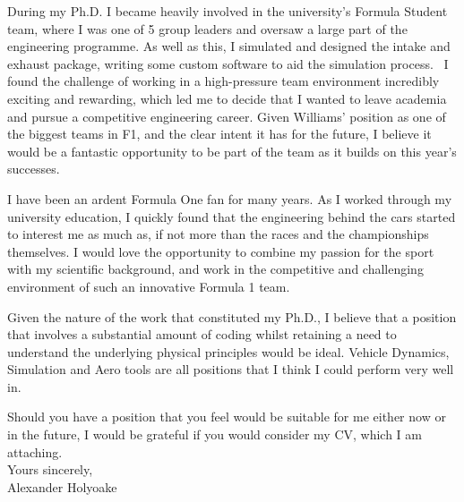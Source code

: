 \documentclass[a4paper,10pt]{article}
\begin{document}
During my Ph.D. I became heavily involved in the university's Formula Student team, where I was one of 5 group leaders and oversaw a large part of the engineering programme. As well as this, I simulated and designed the intake and exhaust package, writing some custom software to aid the simulation process.  I found the challenge of working in a high-pressure team environment incredibly exciting and rewarding, which led me to decide that I wanted to leave academia and pursue a competitive engineering career. Given Williams’ position as one of the biggest teams in F1, and the clear intent it has for the future, I believe it would be a fantastic opportunity to be part of the team as it builds on this year’s successes.

I have been an ardent Formula One fan for many years. As I worked through my university education, I quickly found that the engineering behind the cars started to interest me as much as, if not more than the races and the championships themselves. I would love the opportunity to combine my passion for the sport with my scientific background, and work in the competitive and challenging environment of such an innovative Formula 1 team. 

Given the nature of the work that constituted my Ph.D., I believe that a position that involves a substantial amount of coding whilst retaining a need to understand the underlying physical principles would be ideal. Vehicle Dynamics, Simulation and Aero tools are all positions that I think I could perform very well in.

Should you have a position that you feel would be suitable for me either now or in the future, I would be grateful if you would consider my CV, which I am attaching.
\\

\noindent
Yours sincerely,\\ 

Alexander Holyoake  
\end{document}
